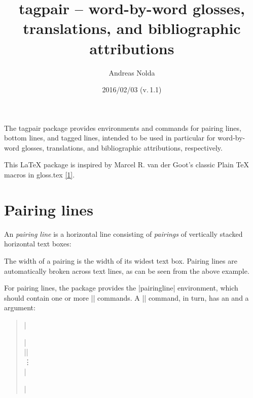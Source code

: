 \documentclass[a4paper]{ltxdoc}
\begin{document}
\title{\textsf{tagpair} -- word-by-word glosses, translations, and bibliographic
attributions}
\author{Andreas Nolda}
\date{2016/02/03 (v.\,1.1)}
\maketitle

\noindent The \textsf{tagpair} package provides environments and commands for
pairing lines, bottom lines, and tagged lines, intended to be used in particular
for word-by-word glosses, translations, and bibliographic attributions,
respectively.

This \LaTeX{} package is inspired by Marcel R. van der Goot's classic Plain
\TeX{} macros in \textsf{gloss.tex} \hyperlink{goot}{[1]}.

\section{Pairing lines}

An \emph{pairing line} is a horizontal line consisting of \emph{pairings} of
vertically stacked horizontal text boxes:
\begin{quote}
\begin{pairingline}
\end{pairingline}
\end{quote}
The width of a pairing is the width of its widest text box. Pairing lines are
automatically broken across text lines, as can be seen from the above example.

\DescribeMacro{\pairing} For pairing lines, the
package provides the |pairingline| environment, which should contain one or more
|\pairing| commands. A |\pairing| command, in turn, has an  and
a  argument:
\begin{quote}
|\begin{pairingline}| \\
|| \\
\vdots \\
|\end{pairingline}|
\end{quote}
\end{document}

